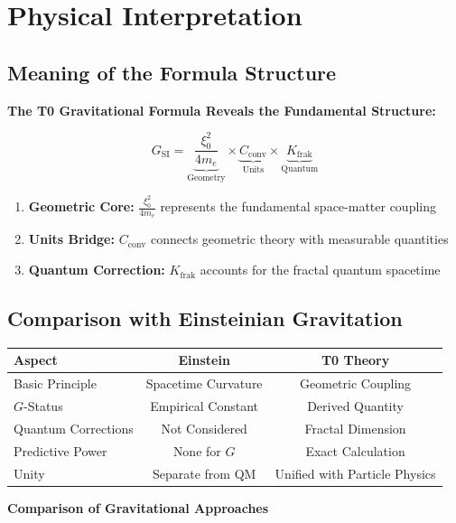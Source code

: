 	\section{Physical Interpretation}
	
	\subsection{Meaning of the Formula Structure}
	
	\begin{keyresult}
		\textbf{The T0 Gravitational Formula Reveals the Fundamental Structure:}
		
		\begin{equation}
			G_{\text{SI}} = \underbrace{\frac{\xi_0^2}{4 m_e}}_{\text{Geometry}} \times \underbrace{C_{\text{conv}}}_{\text{Units}} \times \underbrace{K_{\text{frak}}}_{\text{Quantum}}
		\end{equation}
		
		\begin{enumerate}
			\item \textbf{Geometric Core:} $\frac{\xi_0^2}{4 m_e}$ represents the fundamental space-matter coupling
			
			\item \textbf{Units Bridge:} $C_{\text{conv}}$ connects geometric theory with measurable quantities
			
			\item \textbf{Quantum Correction:} $K_{\text{frak}}$ accounts for the fractal quantum spacetime
		\end{enumerate}
	\end{keyresult}
	
	\subsection{Comparison with Einsteinian Gravitation}
	
	\begin{center}
		\begin{tabular}{lcc}
			\toprule
			\textbf{Aspect} & \textbf{Einstein} & \textbf{T0 Theory} \\
			\midrule
			Basic Principle & Spacetime Curvature & Geometric Coupling \\
			$G$-Status & Empirical Constant & Derived Quantity \\
			Quantum Corrections & Not Considered & Fractal Dimension \\
			Predictive Power & None for $G$ & Exact Calculation \\
			Unity & Separate from QM & Unified with Particle Physics \\
			\bottomrule
		\end{tabular}
		\par\vspace{0.5em}
		\textbf{Comparison of Gravitational Approaches}
	\end{center}
	
